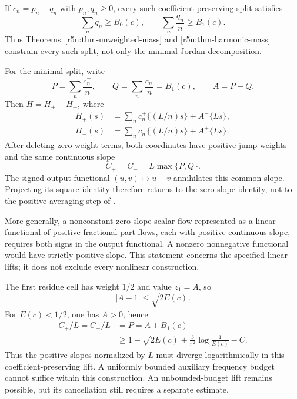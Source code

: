 \documentclass[11pt,a4paper]{article}
\theoremstyle{definition}\newtheorem{definition}[theorem]{Definition}
\theoremstyle{remark}\newtheorem{remark}[theorem]{Remark}
\numberwithin{equation}{section}
\begin{document}
If \(c_n=p_n-q_n\) with \(p_n,q_n\ge0\), every such
coefficient-preserving split satisfies
\begin{equation}
\label{r5n:eq-splitting-budget}
 \sum_nq_n\ge B_0(c),\qquad
 \sum_n\frac{q_n}{n}\ge B_1(c).
\end{equation}
Thus Theorems~\ref{r5n:thm-unweighted-mass} and
\ref{r5n:thm-harmonic-mass} constrain every such split, not
only the minimal Jordan decomposition.

For the minimal split, write
\[
 P=\sum_n\frac{c_n^+}{n},\qquad
 Q=\sum_n\frac{c_n^-}{n}=B_1(c),\qquad A=P-Q.
\]
Then \(H=H_+-H_-\), where
\[
 \begin{aligned}
 H_+(s)&=\sum_nc_n^+\{(L/n)s\}+A^-\{Ls\},\\
 H_-(s)&=\sum_nc_n^-\{(L/n)s\}+A^+\{Ls\}.
 \end{aligned}
\]
After deleting zero-weight terms, both coordinates have positive
jump weights and the same continuous slope
\begin{equation}
\label{r5n:eq-positive-slopes}
 C_+=C_-=L\max\{P,Q\}.
\end{equation}
The signed output functional \((u,v)\mapsto u-v\) annihilates
this common slope. Projecting its square identity therefore
returns to the zero-slope identity, not to the positive averaging
step of \cite{VMRC200}.

More generally, a nonconstant zero-slope scalar flow represented
as a linear functional of positive fractional-part flows, each
with positive continuous slope, requires both signs in the
output functional. A nonzero nonnegative functional would have
strictly positive slope. This statement concerns the specified
linear lifts; it does not exclude every nonlinear construction.

The first residue cell has weight \(1/2\) and value \(z_1=A\),
so
\begin{equation}
\label{r5n:eq-first-cell}
 |A-1|\le\sqrt{2E(c)}.
\end{equation}
For \(E(c)<1/2\), one has \(A>0\), hence
\begin{equation}
\label{r5n:eq-normalized-positive-slope}
 \begin{aligned}
 C_+/L=C_-/L
 &=P=A+B_1(c)\\
 &\ge1-\sqrt{2E(c)}
       +\frac3{\pi^2}\log\frac1{E(c)}-C.
 \end{aligned}
\end{equation}
Thus the positive slopes normalized by \(L\) must diverge
logarithmically in this coefficient-preserving lift.
A uniformly bounded auxiliary frequency budget cannot suffice
within this construction. An unbounded-budget lift remains
possible, but its cancellation still requires a separate estimate.
\end{document}
